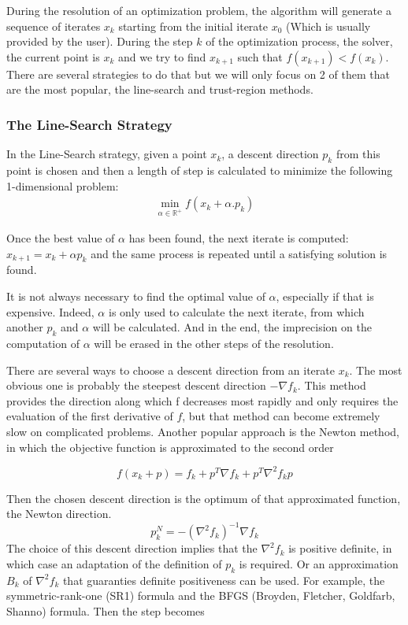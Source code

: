 During the resolution of an optimization problem, the algorithm will generate a
sequence of iterates $x_k$ starting from the initial iterate $x_0$ (Which is
usually provided by the user). During the step $k$ of the optimization process,
the solver, the current point is $x_k$ and we try to find $x_{k+1}$ such that
$f(x_{k+1}) < f(x_k)$. There are several strategies to do that but we will only focus
on 2 of them that are the most popular, the line-search and trust-region
methods.

\subsubsection{The Line-Search Strategy}
In the Line-Search strategy, given a point $x_k$, a descent direction $p_k$ from this
point is chosen and then a length of step is calculated to minimize the
following 1-dimensional problem:
\begin{align}
  \min_{\alpha \in \mathbb{R}^+} f(x_k + \alpha.p_k)
\label{eq:lineSearchNLP}
\end{align}

Once the best value of $\alpha$ has been found, the next iterate is computed:
$x_{k+1} = x_{k} + \alpha p_k$ and the same process is repeated until a
satisfying solution is found.

It is not always necessary to find the optimal value of $\alpha$, especially if
that is expensive. Indeed, $\alpha$ is only used to calculate the next iterate,
from which another $p_k$ and $\alpha$ will be calculated. And in the end, the
imprecision on the computation of $\alpha$ will be erased in the other steps of
the resolution.

There are several ways to choose a descent direction from an iterate $x_k$. The
most obvious one is probably the steepest descent direction $-\nabla f_k$. This
method provides the direction along which f decreases most rapidly and only
requires the evaluation of the first derivative of $f$, but that method can
become extremely slow on complicated problems. Another popular approach is the
Newton method, in which the objective function is approximated to the second
order

\begin{equation}
  f(x_k+p) = f_k + p^T\nabla f_k + p^T\nabla^2f_k p
\end{equation}

Then the chosen descent direction is the optimum of that approximated function,
the Newton direction.
\begin{equation}
  p^N_k = -{(\nabla^2 f_k)}^{-1} \nabla f_k
\end{equation}
The choice of this descent direction implies that the $\nabla^2f_k$ is positive
definite, in which case an adaptation of the definition of $p_k$ is required. Or
an approximation $B_k$ of $\nabla^2f_k$ that guaranties definite positiveness can be
used. For example, the symmetric-rank-one (SR1) formula and the BFGS (Broyden,
Fletcher, Goldfarb, Shanno) formula. Then the step becomes

